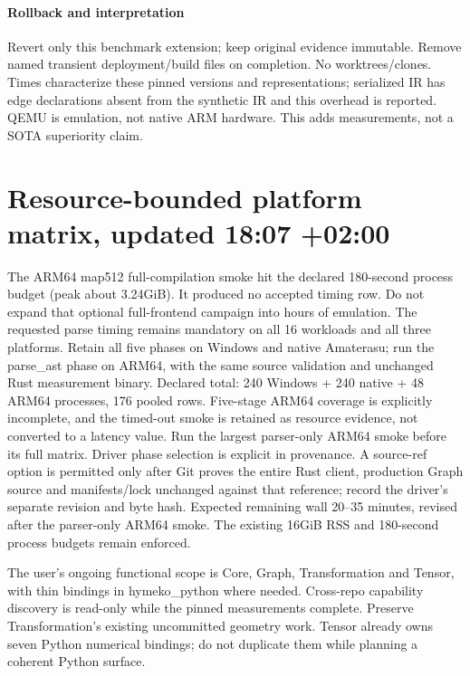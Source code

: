 \documentclass{article}
\begin{document}
\paragraph{Rollback and interpretation} Revert only this benchmark extension;
keep original evidence immutable. Remove named transient deployment/build files
on completion. No worktrees/clones. Times characterize these pinned versions and
representations; serialized IR has edge declarations absent from the synthetic
IR and this overhead is reported. QEMU is emulation, not native ARM hardware.
This adds measurements, not a SOTA superiority claim.


\section*{Resource-bounded platform matrix, updated 18:07 +02:00}
The ARM64 map512 full-compilation smoke hit the declared 180-second process
budget (peak about 3.24GiB). It produced no accepted timing row. Do not expand
that optional full-frontend campaign into hours of emulation. The requested
parse timing remains mandatory on all 16 workloads and all three platforms.
Retain all five phases on Windows and native Amaterasu; run the parse\_ast phase
on ARM64, with the same source validation and unchanged Rust measurement binary.
Declared total: 240 Windows + 240 native + 48 ARM64 processes, 176 pooled rows.
Five-stage ARM64 coverage is explicitly incomplete, and the timed-out smoke is
retained as resource evidence, not converted to a latency value. Run the largest
parser-only ARM64 smoke before its full matrix. Driver phase selection is explicit
in provenance. A source-ref option is permitted only after Git proves the entire
Rust client, production Graph source and manifests/lock unchanged against that
reference; record the driver's separate revision and byte hash. Expected remaining
wall 20--35 minutes, revised after the parser-only ARM64 smoke. The existing
16GiB RSS and 180-second process budgets remain enforced.

The user's ongoing functional scope is Core, Graph, Transformation and Tensor,
with thin bindings in hymeko\_python where needed. Cross-repo capability discovery
is read-only while the pinned measurements complete. Preserve Transformation's
existing uncommitted geometry work. Tensor already owns seven Python numerical
bindings; do not duplicate them while planning a coherent Python surface.
\end{document}
